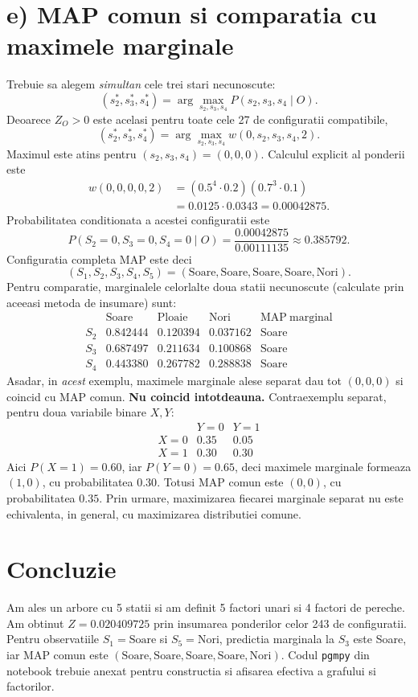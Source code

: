 \documentclass[11pt,a4paper]{article}
\begin{document}
\section*{e) MAP comun si comparatia cu maximele marginale}
Trebuie sa alegem \emph{simultan} cele trei stari necunoscute:
\[
(s_2^*,s_3^*,s_4^*)=\arg\max_{s_2,s_3,s_4}P(s_2,s_3,s_4\mid O).
\]
Deoarece $Z_O>0$ este acelasi pentru toate cele 27 de configuratii compatibile,
\[
(s_2^*,s_3^*,s_4^*)=\arg\max_{s_2,s_3,s_4}w(0,s_2,s_3,s_4,2).
\]
Maximul este atins pentru $(s_2,s_3,s_4)=(0,0,0)$. Calculul explicit al ponderii este
\begin{align*}
w(0,0,0,0,2)
&=(0.5^4\cdot0.2)(0.7^3\cdot0.1)\\
&=0.0125\cdot0.0343=\boxed{0.00042875}.
\end{align*}
Probabilitatea conditionata a acestei configuratii este
\[
P(S_2=0,S_3=0,S_4=0\mid O)=\frac{0.00042875}{0.00111135}\approx\boxed{0.385792}.
\]
Configuratia completa MAP este deci
\[
\boxed{(S_1,S_2,S_3,S_4,S_5)=(\mathrm{Soare},\mathrm{Soare},\mathrm{Soare},\mathrm{Soare},\mathrm{Nori})}.
\]
Pentru comparatie, marginalele celorlalte doua statii necunoscute (calculate prin aceeasi metoda de insumare) sunt:
\[
\begin{array}{c|ccc|c}
&\mathrm{Soare}&\mathrm{Ploaie}&\mathrm{Nori}&\mathrm{MAP\ marginal}\\\hline
S_2&0.842444&0.120394&0.037162&\mathrm{Soare}\\
S_3&0.687497&0.211634&0.100868&\mathrm{Soare}\\
S_4&0.443380&0.267782&0.288838&\mathrm{Soare}
\end{array}
\]
Asadar, in \emph{acest} exemplu, maximele marginale alese separat dau tot $(0,0,0)$ si coincid cu MAP comun. \textbf{Nu coincid intotdeauna.} Contraexemplu separat, pentru doua variabile binare $X,Y$:
\[
\begin{array}{c|cc}
 &Y=0&Y=1\\\hline
X=0&0.35&0.05\\
X=1&0.30&0.30
\end{array}
\]
Aici $P(X=1)=0.60$, iar $P(Y=0)=0.65$, deci maximele marginale formeaza $(1,0)$, cu probabilitatea $0.30$. Totusi MAP comun este $(0,0)$, cu probabilitatea $0.35$. Prin urmare, maximizarea fiecarei marginale separat nu este echivalenta, in general, cu maximizarea distributiei comune.

\section*{Concluzie}
Am ales un arbore cu 5 statii si am definit 5 factori unari si 4 factori de pereche. Am obtinut $Z=0.020409725$ prin insumarea ponderilor celor 243 de configuratii. Pentru observatiile $S_1=\mathrm{Soare}$ si $S_5=\mathrm{Nori}$, predictia marginala la $S_3$ este Soare, iar MAP comun este $(\mathrm{Soare},\mathrm{Soare},\mathrm{Soare},\mathrm{Soare},\mathrm{Nori})$. Codul \texttt{pgmpy} din notebook trebuie anexat pentru constructia si afisarea efectiva a grafului si factorilor.
\end{document}
